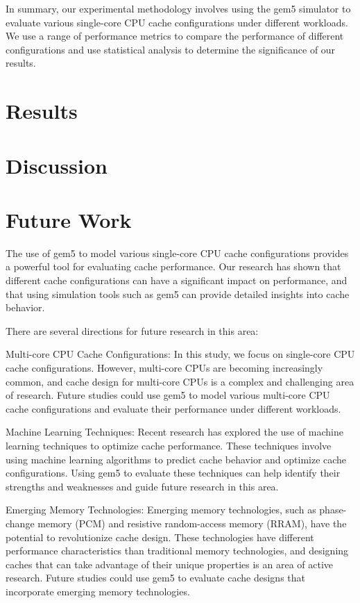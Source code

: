 \documentclass[conference]{IEEEtran}
\begin{document}
In summary, our experimental methodology involves using the gem5 simulator to evaluate various single-core CPU cache configurations under different workloads. We use a range of performance metrics to compare the performance of different configurations and use statistical analysis to determine the significance of our results.

\section{Results}



\section{Discussion}


\section{Future Work}
The use of gem5 to model various single-core CPU cache configurations provides a powerful tool for evaluating cache performance. Our research has shown that different cache configurations can have a significant impact on performance, and that using simulation tools such as gem5 can provide detailed insights into cache behavior.

There are several directions for future research in this area:

Multi-core CPU Cache Configurations: In this study, we focus on single-core CPU cache configurations. However, multi-core CPUs are becoming increasingly common, and cache design for multi-core CPUs is a complex and challenging area of research. Future studies could use gem5 to model various multi-core CPU cache configurations and evaluate their performance under different workloads.

Machine Learning Techniques: Recent research has explored the use of machine learning techniques to optimize cache performance. These techniques involve using machine learning algorithms to predict cache behavior and optimize cache configurations. Using gem5 to evaluate these techniques can help identify their strengths and weaknesses and guide future research in this area.

Emerging Memory Technologies: Emerging memory technologies, such as phase-change memory (PCM) and resistive random-access memory (RRAM), have the potential to revolutionize cache design. These technologies have different performance characteristics than traditional memory technologies, and designing caches that can take advantage of their unique properties is an area of active research. Future studies could use gem5 to evaluate cache designs that incorporate emerging memory technologies.
\end{document}
